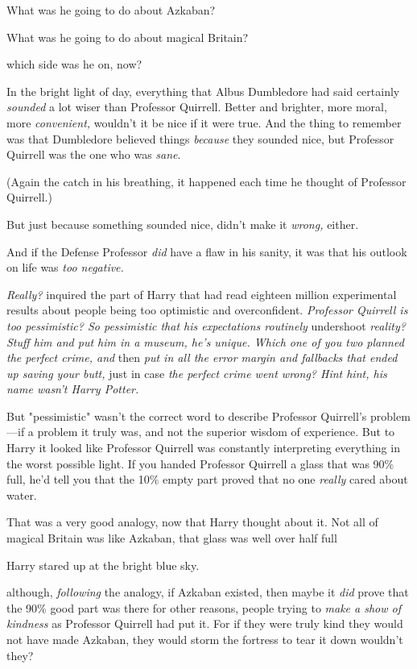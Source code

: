 What was he going to do about Azkaban?

What was he going to do about magical Britain?

{\el} which side was he on, now?

In the bright light of day, everything that Albus Dumbledore had said certainly
\emph{sounded} a lot wiser than Professor Quirrell. Better and brighter, more
moral, more \emph{convenient,} wouldn't it be nice if it were true. And the
thing to remember was that Dumbledore believed things \emph{because} they
sounded nice, but Professor Quirrell was the one who was \emph{sane}.

(Again the catch in his breathing, it happened each time he thought of
Professor Quirrell.)

But just because something sounded nice, didn't make it \emph{wrong,} either.

And if the Defense Professor \emph{did} have a flaw in his sanity, it was that
his outlook on life was \emph{too negative.}

\emph{Really?} inquired the part of Harry that had read eighteen million
experimental results about people being too optimistic and overconfident.
\emph{Professor Quirrell is too pessimistic? So pessimistic that his
expectations routinely} undershoot \emph{reality? Stuff him and put him in a
museum, he's unique. Which one of you two planned the perfect crime, and}
then \emph{put in all the error margin and fallbacks that ended up saving your
butt,} just in case \emph{the perfect crime went wrong? Hint hint, his name
wasn't Harry Potter.}

But "pessimistic" wasn't the correct word to describe Professor Quirrell's
problem—if a problem it truly was, and not the superior wisdom of experience.
But to Harry it looked like Professor Quirrell was constantly interpreting
everything in the worst possible light. If you handed Professor Quirrell a
glass that was 90\% full, he'd tell you that the 10\% empty part proved that no
one \emph{really} cared about water.

That was a very good analogy, now that Harry thought about it. Not all of
magical Britain was like Azkaban, that glass was well over half full{\el}

Harry stared up at the bright blue sky.

{\el} although, \emph{following} the analogy, if Azkaban existed, then maybe
it \emph{did} prove that the 90\% good part was there for other reasons, people
trying to \emph{make a show of kindness} as Professor Quirrell had put it. For
if they were truly kind they would not have made Azkaban, they would storm the
fortress to tear it down{\el} wouldn't they?

